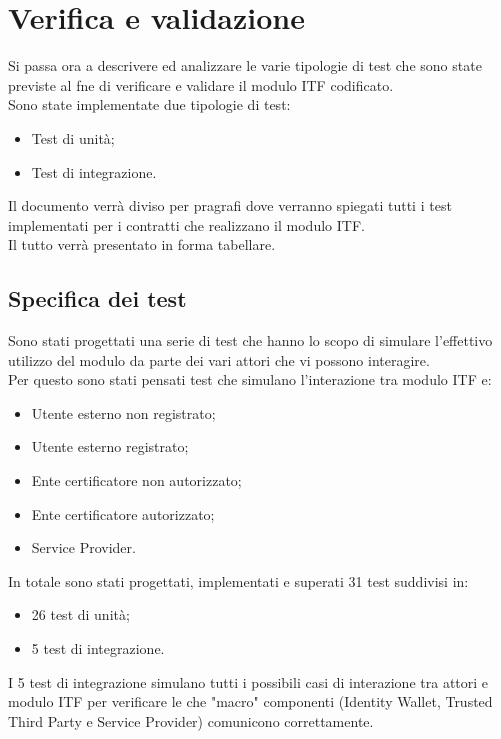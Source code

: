 
\chapter{Verifica e validazione}
\label{cap:verifica_validazione}
Si passa ora a descrivere ed analizzare le varie tipologie di test che sono state previste al fne di verificare e validare il modulo \gls{ITF} codificato.\\
Sono state implementate due tipologie di test:
\begin{itemize}
	\item Test di unità;
	\item Test di integrazione.
\end{itemize}
Il documento verrà diviso per pragrafi dove verranno spiegati tutti i test implementati per i contratti che realizzano il modulo \gls{ITF}.\\
Il tutto verrà presentato in forma tabellare.
\section{Specifica dei test}
Sono stati progettati una serie di test che hanno lo scopo di simulare l'effettivo utilizzo del modulo da parte dei vari attori che vi possono interagire.\\
Per questo sono stati pensati test che simulano l'interazione tra modulo \gls{ITF} e:
\begin{itemize}
	\item Utente esterno non registrato;
	\item Utente esterno registrato;
	\item Ente certificatore non autorizzato;
	\item Ente certificatore autorizzato;
	\item Service Provider.
\end{itemize}
In totale sono stati progettati, implementati e superati 31 test suddivisi in:
\begin{itemize}
	\item 26 test di unità;
	\item 5 test di integrazione.
\end{itemize}
I 5 test di integrazione simulano tutti i possibili casi di interazione tra attori e modulo \gls{ITF} per verificare le che "macro" componenti (Identity Wallet, Trusted Third Party e Service Provider) comunicono correttamente.
